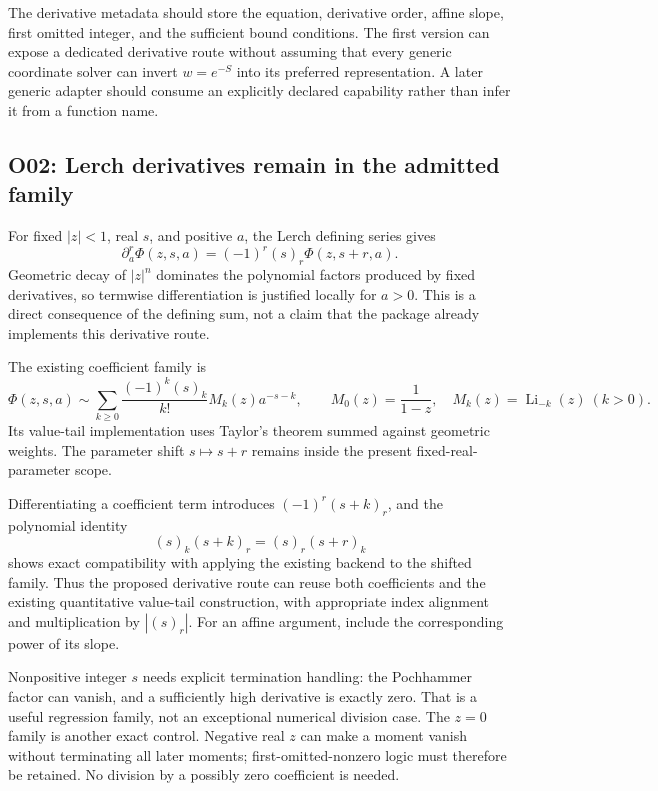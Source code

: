 \documentclass[11pt,a4paper]{article}
\begin{document}
The derivative metadata should store the equation, derivative order, affine slope, first omitted integer, and the sufficient bound conditions. The first version can expose a dedicated derivative route without assuming that every generic coordinate solver can invert \(w=e^{-S}\) into its preferred representation. A later generic adapter should consume an explicitly declared capability rather than infer it from a function name.

\subsection{O02: Lerch derivatives remain in the admitted family}
For fixed \(|z|<1\), real \(s\), and positive \(a\), the Lerch defining series gives
\begin{equation}
 \partial_a^r\Phi(z,s,a)=(-1)^r(s)_r\Phi(z,s+r,a).
 \label{eq:lerch-derivative}
\end{equation}
Geometric decay of \(|z|^n\) dominates the polynomial factors produced by fixed derivatives, so termwise differentiation is justified locally for \(a>0\). This is a direct consequence of the defining sum, not a claim that the package already implements this derivative route.\cite{dlmf-lerch}

The existing coefficient family is
\[
 \Phi(z,s,a)\sim
 \sum_{k\ge0}\frac{(-1)^k(s)_k}{k!}M_k(z)a^{-s-k},
 \qquad
 M_0(z)=\frac1{1-z},\quad M_k(z)=\operatorname{Li}_{-k}(z)\ (k>0).
\]
Its value-tail implementation uses Taylor's theorem summed against geometric weights. The parameter shift \(s\mapsto s+r\) remains inside the present fixed-real-parameter scope.\cite{dirichlet}

Differentiating a coefficient term introduces \((-1)^r(s+k)_r\), and the polynomial identity
\[
 (s)_k(s+k)_r=(s)_r(s+r)_k
\]
shows exact compatibility with applying the existing backend to the shifted family. Thus the proposed derivative route can reuse both coefficients and the existing quantitative value-tail construction, with appropriate index alignment and multiplication by \(|(s)_r|\). For an affine argument, include the corresponding power of its slope.

Nonpositive integer \(s\) needs explicit termination handling: the Pochhammer factor can vanish, and a sufficiently high derivative is exactly zero. That is a useful regression family, not an exceptional numerical division case. The \(z=0\) family is another exact control. Negative real \(z\) can make a moment vanish without terminating all later moments; first-omitted-nonzero logic must therefore be retained. No division by a possibly zero coefficient is needed.
\end{document}
